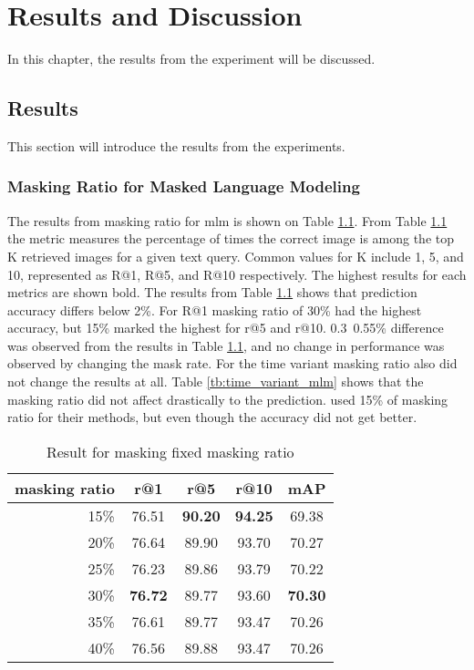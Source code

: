 

\chapter{Results and Discussion}
In this chapter, the results from the experiment will be discussed.

\section{Results}
This section will introduce the results from the experiments.

\subsection{Masking Ratio for Masked Language Modeling}
The results from masking ratio for \acrshort{mlm} is shown on Table \ref{tb:fixed_mlm}. From Table \ref{tb:fixed_mlm} the metric measures the percentage of times the correct image is among the top K retrieved images for a given text query. Common values for K include 1, 5, and 10, represented as R@1, R@5, and R@10 respectively. The highest results for each metrics are shown bold.
The results from Table \ref{tb:fixed_mlm} shows that prediction accuracy differs below 2\%. For R@1 masking ratio of 30\% had the highest accuracy, but 15\% marked the highest for r@5 and r@10. 0.3~0.55\% difference was observed from the results in Table \ref{tb:fixed_mlm}, and no change in performance was observed by changing the mask rate.
For the time variant masking ratio also did not change the results at all. Table \ref{tb:time_variant_mlm} shows that the masking ratio did not affect drastically to the prediction. \cite{Bai2023RaSaRA} used 15\% of masking ratio for their methods, but even though the accuracy did not get better.

\begin{table}[htbp]
    \centering
    \caption{Result for masking fixed masking ratio}
    \label{tb:fixed_mlm}
    
    \begin{tabular}{rcccc}
      masking ratio & r@1 & r@5 & r@10 & mAP\\ \hline
      15\% & 76.51 & \textbf{90.20} & \textbf{94.25} & 69.38 \\
      20\% & 76.64 & 89.90 & 93.70 & 70.27 \\
      25\% & 76.23 & 89.86 & 93.79 & 70.22 \\
      30\% & \textbf{76.72} & 89.77 & 93.60 & \textbf{70.30} \\
      35\% & 76.61 & 89.77 & 93.47 & 70.26 \\
      40\% & 76.56 & 89.88 & 93.47 & 70.26
    \end{tabular}
\end{table}

